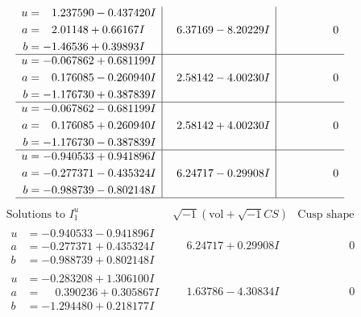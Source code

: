 \documentclass[1p]{elsarticle_modified}
\theoremstyle{definition}
\newcommand{\I}{\sqrt{-1}}
\begin{document}
$$\begin{array}{c|c|c}
\begin{aligned}
u &= \phantom{-}1.237590 - 0.437420 I \\
a &= \phantom{-}2.01148 + 0.66167 I \\
b &= -1.46536 + 0.39893 I\end{aligned}
 & \phantom{-}6.37169 - 8.20229 I & \phantom{-0.000000 } 0 \\ \hline\begin{aligned}
u &= -0.067862 + 0.681199 I \\
a &= \phantom{-}0.176085 - 0.260940 I \\
b &= -1.176730 + 0.387839 I\end{aligned}
 & \phantom{-}2.58142 - 4.00230 I & \phantom{-0.000000 } 0 \\ \hline\begin{aligned}
u &= -0.067862 - 0.681199 I \\
a &= \phantom{-}0.176085 + 0.260940 I \\
b &= -1.176730 - 0.387839 I\end{aligned}
 & \phantom{-}2.58142 + 4.00230 I & \phantom{-0.000000 } 0 \\ \hline\begin{aligned}
u &= -0.940533 + 0.941896 I \\
a &= -0.277371 - 0.435324 I \\
b &= -0.988739 - 0.802148 I\end{aligned}
 & \phantom{-}6.24717 - 0.29908 I & \phantom{-0.000000 } 0\\
 \hline 
 \end{array}$$\newpage$$\begin{array}{c|c|c}  
\text{Solutions to }I^u_{1}& \I (\text{vol} + \sqrt{-1}CS) & \text{Cusp shape}\\
 \hline 
\begin{aligned}
u &= -0.940533 - 0.941896 I \\
a &= -0.277371 + 0.435324 I \\
b &= -0.988739 + 0.802148 I\end{aligned}
 & \phantom{-}6.24717 + 0.29908 I & \phantom{-0.000000 } 0 \\ \hline\begin{aligned}
u &= -0.283208 + 1.306100 I \\
a &= \phantom{-}0.390236 + 0.305867 I \\
b &= -1.294480 + 0.218177 I\end{aligned}
 & \phantom{-}1.63786 - 4.30834 I & \phantom{-0.000000 } 0 \\ \hline\begin{aligned}

\end{aligned}
\end{array}$$
\end{document}

